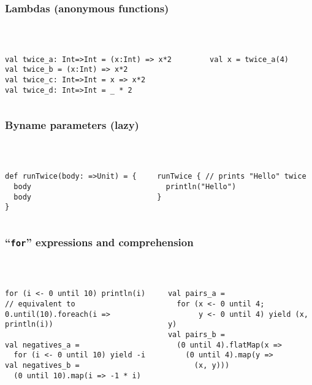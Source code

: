 \documentclass[aspectratio=169]{beamer}
\begin{document}
\begin{frame}[fragile]\frametitle{Lambdas (anonymous functions)}    
~\\[-8mm]
\begin{columns}
\begin{column}{0.58\textwidth}
\begin{lstlisting}
val twice_a: Int=>Int = (x:Int) => x*2
val twice_b = (x:Int) => x*2
val twice_c: Int=>Int = x => x*2
val twice_d: Int=>Int = _ * 2
\end{lstlisting}
\end{column}
\begin{column}{0.40\textwidth}
\begin{lstlisting}
val x = twice_a(4)
\end{lstlisting}%
\end{column}
\end{columns}
\end{frame}


\begin{frame}[fragile]\frametitle{Byname parameters (lazy)}
~\\[-8mm]
\begin{columns}
\begin{column}{0.49\textwidth}
\begin{lstlisting}
def runTwice(body: =>Unit) = {
  body
  body
}
\end{lstlisting}
\end{column}
\begin{column}{0.49\textwidth}
\begin{lstlisting}
runTwice { // prints "Hello" twice
  println("Hello")
}
\end{lstlisting}%
\end{column}
\end{columns}
\end{frame}


\begin{frame}[fragile]\frametitle{``\texttt{for}'' expressions and comprehension}
~\\[-8mm]
\begin{columns}
\begin{column}{0.50\textwidth}
\begin{lstlisting}[emph={foreach,map,flatMap}]
for (i <- 0 until 10) println(i)
// equivalent to
0.until(10).foreach(i => println(i))

val negatives_a =
  for (i <- 0 until 10) yield -i
val negatives_b =
  (0 until 10).map(i => -1 * i)
\end{lstlisting}
\end{column}
\begin{column}{0.48\textwidth}
\pause
\begin{lstlisting}[emph={foreach,map,flatMap}]
val pairs_a =
  for (x <- 0 until 4;
       y <- 0 until 4) yield (x, y)
val pairs_b =
  (0 until 4).flatMap(x =>
    (0 until 4).map(y =>
      (x, y)))
\end{lstlisting}
\end{column}
\end{columns}
\end{frame}
\end{document}

